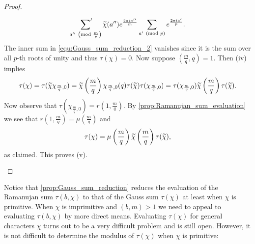\begin{proof}
\begin{enumerate}[label=(\roman*)]
          \begin{equation}\label{equ:Gauss_sum_reduction_2}
            \sideset{}{'}\sum_{a'' \ \left(\text{mod }\frac{m}{p}\right)}\widetilde{\chi}(a'')e^{\frac{2\pi ia''}{m}}\sum_{a' \ \left(\text{mod }p\right)}e^{\frac{2\pi ia'}{p}}.
          \end{equation}
          The inner sum in \cref{equ:Gauss_sum_reduction_2} vanishes since it is the sum over all $p$-th roots of unity and thus $\tau(\chi) = 0$. Now suppose $\left(\frac{m}{q},q\right) = 1$. Then (iv) implies
          \[
            \tau(\chi) = \tau(\widetilde{\chi}\chi_{\frac{m}{q},0}) = \widetilde{\chi}\left(\frac{m}{q}\right)\chi_{\frac{m}{q},0}(q)\tau(\widetilde{\chi})\tau(\chi_{\frac{m}{q},0}) = \tau(\chi_{\frac{m}{q},0})\widetilde{\chi}\left(\frac{m}{q}\right)\tau(\widetilde{\chi}).
          \]
          Now observe that $\tau(\chi_{\frac{m}{q},0}) = r\left(1,\frac{m}{q}\right)$. By \cref{prop:Ramanujan_sum_evaluation} we see that $r\left(1,\frac{m}{q}\right) = \mu\left(\frac{m}{q}\right)$ and
          \[
            \tau(\chi) = \mu\left(\frac{m}{q}\right)\widetilde{\chi}\left(\frac{m}{q}\right)\tau(\widetilde{\chi}),
          \]
          as claimed. This proves (v).
        \end{enumerate}
      \end{proof}

      Notice that \cref{prop:Gauss_sum_reduction} reduces the evaluation of the Ramanujan sum $\tau(b,\chi)$ to that of the Gauss sum $\tau(\chi)$ at least when $\chi$ is primitive. When $\chi$ is imprimitive and $(b,m) > 1$ we need to appeal to evaluating $\tau(b,\chi)$ by more direct means. Evaluating $\tau(\chi)$ for general characters $\chi$ turns out to be a very difficult problem and is still open. However, it is not difficult to determine the modulus of $\tau(\chi)$ when $\chi$ is primitive:

